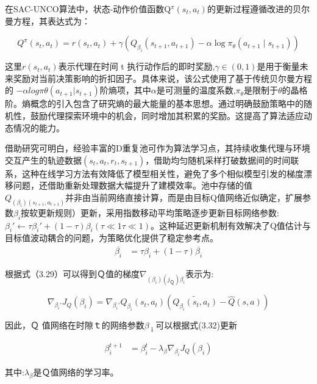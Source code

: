 在SAC-UNCO算法中，状态-动作价值函数Q$^π(s_t,a_t)$的更新过程遵循改进的贝尔曼方程，其表达式为：

\begin{equation}
	Q^{\pi}(s_t, a_t) = r(s_t, a_t) + \gamma \left( Q_{\beta_i}(s_{t+1}, a_{t+1}) - \alpha \log \pi_{\theta}(a_{t+1} \mid s_{t+1}) \right)
\end{equation}

这里$r(s_t,a_t)$表示代理在时间 t 执行动作后的即时奖励,$γ∈(0,1)$是用于衡量未来奖励对当前决策影响的折扣因子。具体来说，该公式使用了基于传统贝尔曼方程的 $−αlog⁡πθ(a_{t+1}|s_{t+1})$阶熵项，其中$α$是可测量的温度系数,$π_θ$是限制于$θ$的晶格阶。熵概念的引入包含了研究熵的最大能量的基本思想。通过明确鼓励策略中的随机性，鼓励代理探索环境中的机会，同时增加其积累的奖励。这提高了算法适应动态情况的能力。

借助研究可明白，经验丰富的D重复池可作为算法学习点，其持续收集代理与环境交互产生的轨迹数据$(s_t,a_t,r_t,s_{t+1})$，借助均匀随机采样打破数据间的时间联系，这种在线学习方法有效降低了模型相关性，避免了多个相似模型引发的梯度漂移问题，还借助重新处理数据大幅提升了建模效率。池中存储的值$Q_{(β_i)(s_{t+1},a_{t+1})}$并非由当前网络直接计算，而是由目标Q值网络近似确定，扩展参数\(β_i\)按软更新规则）更新，采用指数移动平均策略逐步更新目标网络参数:$β_i′​←τβ_i′​+(1−τ)β_i(τ≪1τ≪1)$。这种延迟更新机制有效解决了Q值估计与目标值波动耦合的问题，为策略优化提供了稳定参考点。
\begin{align}
	\overline{\beta_i} &= \tau \beta_i + (1 - \tau) \overline{\beta_i}
\end{align}

根据式（3.29）可以得到Ｑ值的梯度$∇_{(β_i) (j_Ｑ)β_i}$表示为:

\begin{equation}
	\nabla_{\beta_i'} J_Q(\beta_i) = \nabla_{\beta_i'} Q_{\beta_i}(s_t, a_t) \left( \widetilde{Q_{\beta_i}(s_t, a_t)} - \hat{Q}(s, a) \right)
\end{equation}

因此，Ｑ 值网络在时隙ｔ的网络参数$β_ｉ$可以根据式(3.32)更新

\begin{align}
	\beta_{i}^{t+1} &= \beta_{i}^{t} - \lambda_{\beta} \nabla_{\beta_{i}} J_{Q}(\beta_{i})
\end{align}

其中:$λ_β$是Ｑ值网络的学习率。
